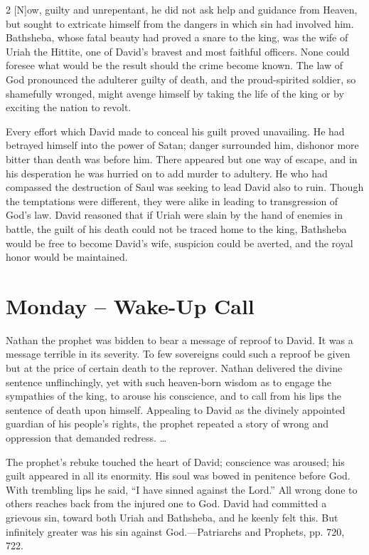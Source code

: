 \documentclass[a4paper, 10pt, twoside, headings=small]{scrartcl}
\begin{document}
\begin{multicols}{2}
[N]ow, guilty and unrepentant, he did not ask help and guidance from Heaven, but sought to extricate himself from the dangers in which sin had involved him. Bathsheba, whose fatal beauty had proved a snare to the king, was the wife of Uriah the Hittite, one of David’s bravest and most faithful officers. None could foresee what would be the result should the crime become known. The law of God pronounced the adulterer guilty of death, and the proud-spirited soldier, so shamefully wronged, might avenge himself by taking the life of the king or by exciting the nation to revolt.

Every effort which David made to conceal his guilt proved unavailing. He had betrayed himself into the power of Satan; danger surrounded him, dishonor more bitter than death was before him. There appeared but one way of escape, and in his desperation he was hurried on to add murder to adultery. He who had compassed the destruction of Saul was seeking to lead David also to ruin. Though the temptations were different, they were alike in leading to transgression of God’s law. David reasoned that if Uriah were slain by the hand of enemies in battle, the guilt of his death could not be traced home to the king, Bathsheba would be free to become David’s wife, suspicion could be averted, and the royal honor would be maintained.

\section*{Monday – Wake-Up Call}

Nathan the prophet was bidden to bear a message of reproof to David. It was a message terrible in its severity. To few sovereigns could such a reproof be given but at the price of certain death to the reprover. Nathan delivered the divine sentence unflinchingly, yet with such heaven-born wisdom as to engage the sympathies of the king, to arouse his conscience, and to call from his lips the sentence of death upon himself. Appealing to David as the divinely appointed guardian of his people’s rights, the prophet repeated a story of wrong and oppression that demanded redress. …

The prophet’s rebuke touched the heart of David; conscience was aroused; his guilt appeared in all its enormity. His soul was bowed in penitence before God. With trembling lips he said, “I have sinned against the Lord.” All wrong done to others reaches back from the injured one to God. David had committed a grievous sin, toward both Uriah and Bathsheba, and he keenly felt this. But infinitely greater was his sin against God.—Patriarchs and Prophets, pp. 720, 722.


\end{multicols}
\end{document}
